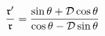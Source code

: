 \begin{equation}
\frac{\frak{r}^{\prime }}{\frak{r}}=\frac{\sin \theta +\mathcal{D}\cos
\theta }{\cos \theta -\mathcal{D}\sin \theta }  \label{eqdiffparticulare}
\end{equation}

